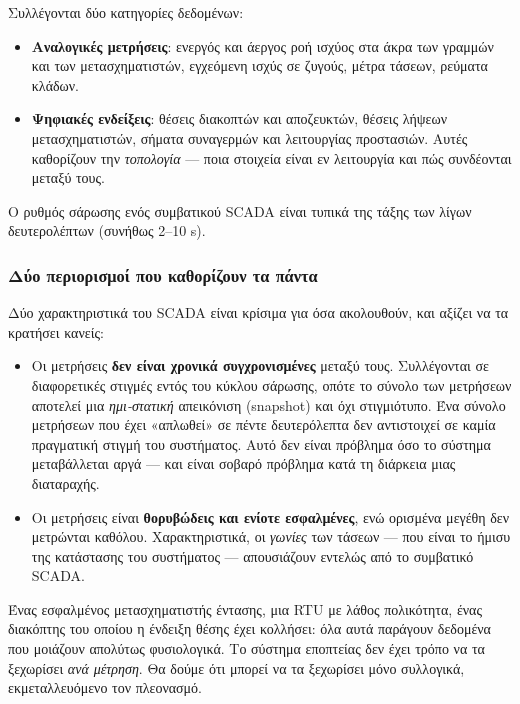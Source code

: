 Συλλέγονται δύο κατηγορίες δεδομένων:

\begin{itemize}
\item \textbf{Αναλογικές μετρήσεις}: ενεργός και άεργος ροή ισχύος στα άκρα των γραμμών και
      των μετασχηματιστών, εγχεόμενη ισχύς σε ζυγούς, μέτρα τάσεων, ρεύματα κλάδων.
\item \textbf{Ψηφιακές ενδείξεις}: θέσεις διακοπτών και αποζευκτών, θέσεις λήψεων
      μετασχηματιστών, σήματα συναγερμών και λειτουργίας προστασιών. Αυτές καθορίζουν την
      \emph{τοπολογία} — ποια στοιχεία είναι εν λειτουργία και πώς συνδέονται μεταξύ τους.
\end{itemize}

Ο ρυθμός σάρωσης ενός συμβατικού SCADA είναι τυπικά της τάξης των λίγων δευτερολέπτων
(συνήθως 2--10 s).

\subsubsection*{Δύο περιορισμοί που καθορίζουν τα πάντα}

Δύο χαρακτηριστικά του SCADA είναι κρίσιμα για όσα ακολουθούν, και αξίζει να τα κρατήσει
κανείς:

\begin{itemize}
\item Οι μετρήσεις \textbf{δεν είναι χρονικά συγχρονισμένες} μεταξύ τους. Συλλέγονται σε
      διαφορετικές στιγμές εντός του κύκλου σάρωσης, οπότε το σύνολο των μετρήσεων αποτελεί
      μια \emph{ημι-στατική} απεικόνιση (snapshot) και όχι στιγμιότυπο. Ένα σύνολο
      μετρήσεων που έχει «απλωθεί» σε πέντε δευτερόλεπτα δεν αντιστοιχεί σε καμία
      πραγματική στιγμή του συστήματος. Αυτό δεν είναι πρόβλημα όσο το σύστημα μεταβάλλεται
      αργά — και είναι σοβαρό πρόβλημα κατά τη διάρκεια μιας διαταραχής.
\item Οι μετρήσεις είναι \textbf{θορυβώδεις και ενίοτε εσφαλμένες}, ενώ ορισμένα μεγέθη
      δεν μετρώνται καθόλου. Χαρακτηριστικά, οι \emph{γωνίες} των τάσεων — που είναι το ήμισυ
      της κατάστασης του συστήματος — απουσιάζουν εντελώς από το συμβατικό SCADA.
\end{itemize}

Ένας εσφαλμένος μετασχηματιστής έντασης, μια RTU με λάθος πολικότητα, ένας διακόπτης του
οποίου η ένδειξη θέσης έχει κολλήσει: όλα αυτά παράγουν δεδομένα που μοιάζουν απολύτως
φυσιολογικά. Το σύστημα εποπτείας δεν έχει τρόπο να τα ξεχωρίσει \emph{ανά μέτρηση}. Θα
δούμε ότι μπορεί να τα ξεχωρίσει μόνο συλλογικά, εκμεταλλευόμενο τον πλεονασμό.

